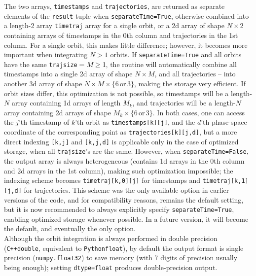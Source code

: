 \documentclass[12pt]{article}
\newcommand{\Cpp}  {\texttt{C++}\xspace}
\newcommand{\Python}{\texttt{Python}\xspace}
\newcommand{\ppp}[1]{\textcolor{darkolive} {\texttt{#1}}}
\begin{document}
The two arrays, \texttt{timestamps} and \texttt{trajectories}, are returned as separate elements of the \texttt{result} tuple when \ppp{separateTime}\texttt{=True}, otherwise combined into a length-2 array \texttt{timetraj} array for a single orbit, or a 2d array of shape $N\times 2$ containing arrays of timestamps in the 0th column and trajectories in the 1st column. For a single orbit, this makes little difference; however, it becomes more important when integrating $N>1$ orbits. If \ppp{separateTime}\texttt{=True} and all orbits have the same \ppp{trajsize}${}=M\ge$1, the routine will automatically combine all timestamps into a single 2d array of shape $N\times M$, and all trajectories -- into another 3d array of shape $N\times M \times \{6\mathrm{\,or\,}3\}$, making the storage very efficient. If orbit sizes differ, this optimization is not possible, so timestamps will be a length-$N$ array containing 1d arrays of length $M_k$, and trajectories will be a length-$N$ array containing 2d arrays of shape $M_k \times \{6\mathrm{\,or\,}3\}$. In both cases, one can access the $j$'th timestamp of $k$'th orbit as \texttt{timestamps[k][j]}, and the $d$'th phase-space coordinate of the corresponding point as \texttt{trajectories[k][j,d]}, but a more direct indexing \texttt{[k,j]} and \texttt{[k,j,d]} is applicable only in the case of optimized storage, when all \texttt{trajsize}'s are the same. However, when \ppp{separateTime}\texttt{=False}, the output array is always heterogeneous (contains 1d arrays in the 0th column and 2d arrays in the 1st column), making such optimization impossible; the indexing scheme becomes \texttt{timetraj[k,0][j]} for timestamps and \texttt{timetraj[k,1][j,d]} for trajectories. This scheme was the only available option in earlier versions of the code, and for compatibility reasons, remains the default setting, but it is now recommended to always explicitly specify \ppp{separateTime}\texttt{=True}, enabling optimized storage whenever possible. In a future version, it will become the default, and eventually the only option.\\
Although the orbit integration is always performed in double precision (\Cpp \texttt{double}, equivalent to \Python \texttt{float}), by default the output format is single precision (\texttt{numpy.float32}) to save memory (with 7 digits of precision usually being enough); setting \ppp{dtype}\texttt{=float} produces double-precision output.\\[1mm]
\end{document}
